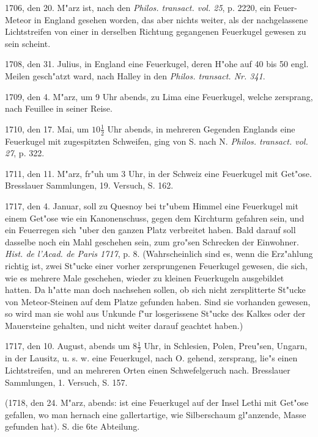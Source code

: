 \documentclass[a4paper, 11pt, oneside, polutonikogreek, german]{article}
\begin{document}
1706, den 20. M"arz ist, nach den \emph{Philos. transact. vol. 25}, p. 2220, ein Feuer-Meteor in England gesehen worden, das aber nichts weiter, als der nachgelassene Lichtstreifen von einer in derselben Richtung gegangenen Feuerkugel gewesen zu sein scheint.

1708, den 31. Julius, in England eine Feuerkugel, deren H"ohe auf 40 bis 50 engl. Meilen gesch"atzt ward, nach Halley in den \emph{Philos. transact. Nr. 341}.

1709, den 4. M"arz, um 9 Uhr abends, zu Lima eine Feuerkugel, welche zersprang, nach Feuillee in seiner Reise.

1710, den 17. Mai, um $\mathfrak{10\frac{1}{2}}$ Uhr abends, in mehreren Gegenden Englands eine Feuerkugel mit zugespitzten Schweifen, ging von S. nach N. \emph{Philos. transact. vol. 27}, p. 322.

1711, den 11. M"arz, fr"uh um 3 Uhr, in der Schweiz eine Feuerkugel mit Get"ose. Bresslauer Sammlungen, 19. Versuch, S. 162.

1717, den 4. Januar, soll zu Quesnoy bei tr"ubem Himmel eine Feuerkugel mit einem Get"ose wie ein Kanonenschuss, gegen dem Kirchturm gefahren sein, und ein Feuerregen sich "uber den ganzen Platz verbreitet haben. Bald darauf soll dasselbe noch ein Mahl geschehen sein, zum gro"sen Schrecken der Einwohner. \emph{Hist. de l'Acad. de Paris 1717}, p. 8. (Wahrscheinlich sind es, wenn die Erz"ahlung richtig ist, zwei St"ucke einer vorher zersprungenen Feuerkugel gewesen, die sich, wie es mehrere Male geschehen, wieder zu kleinen Feuerkugeln ausgebildet hatten. Da h"atte man doch nachsehen sollen, ob sich nicht zersplitterte St"ucke von Meteor-Steinen auf dem Platze gefunden haben. Sind sie vorhanden gewesen, so wird man sie wohl aus Unkunde f"ur losgerissene St"ucke des Kalkes oder der Mauersteine gehalten, und nicht weiter darauf geachtet haben.)

1717, den 10. August, abends um $\mathfrak{8\frac{1}{2}}$ Uhr, in Schlesien, Polen, Preu"sen, Ungarn, in der Lausitz, u. s. w. eine Feuerkugel, nach O. gehend, zersprang, lie"s einen Lichtstreifen, und an mehreren Orten einen Schwefelgeruch nach. Bresslauer Sammlungen, 1. Versuch, S. 157.

(1718, den 24. M"arz, abends: ist eine Feuerkugel auf der Insel Lethi mit Get"ose gefallen, wo man hernach eine gallertartige, wie Silberschaum gl"anzende, Masse gefunden hat). S. die 6te Abteilung.
\end{document}
